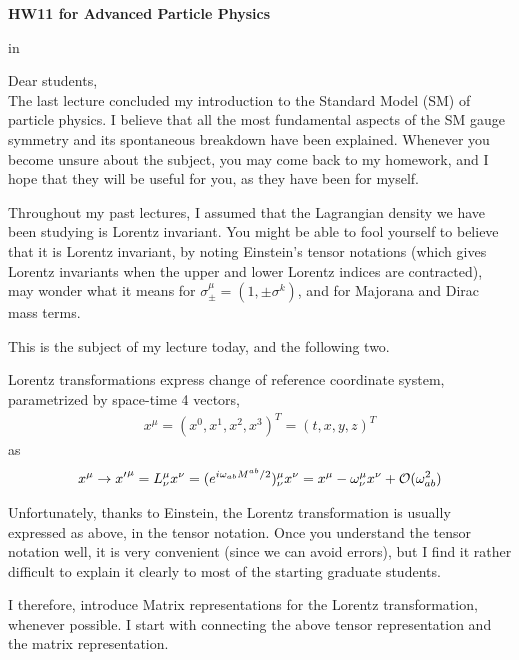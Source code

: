 \documentclass[12pt]{article}
\begin{document}
\begin{center}
{\large\bf HW11 for Advanced Particle Physics} \\

\end{center}

 in

Dear students,\\

  The last lecture concluded my introduction to the Standard Model
  (SM) of particle physics. I believe that all the most fundamental
  aspects of the SM gauge symmetry and its spontaneous breakdown
  have been explained.  Whenever you become unsure about the subject,
  you may come back to my homework, and I hope that they will be
  useful for you, as they have been for myself.

  Throughout my past lectures, I assumed that the Lagrangian
  density we have been studying is Lorentz invariant.  You might
  be able to fool yourself to believe that it is Lorentz invariant,
  by noting Einstein's tensor notations (which gives Lorentz
  invariants when the upper and lower Lorentz indices are
  contracted), may wonder what it means for $\sigma_\pm^\mu
  = (1, \pm \sigma^k)$, and for Majorana and Dirac mass terms.

  This is the subject of my lecture today, and the following two.



  Lorentz transformations express change of reference coordinate
  system, parametrized by space-time 4 vectors,
\begin{eqnarray}
    x^\mu = (x^0, x^1, x^2, x^3)^T = (t, x, y, z)^T \label{eq.11xmu1}
\end{eqnarray}
  as
\begin{eqnarray}
    x^\mu \to {x'}^\mu = L^\mu_\nu x^\nu
                  = (e^{ i \omega_{ab} M^{ab}/2 })^\mu_\nu x^\nu
                  = x^\mu - \omega^\mu_\nu x^\nu + {\cal O}(\omega_{ab}^2) \label{eq.11LT1}
\end{eqnarray}

  Unfortunately, thanks to Einstein, the Lorentz transformation is
  usually expressed as above, in the tensor notation. Once you
  understand the tensor notation well, it is very convenient (since
  we can avoid errors), but I find it rather difficult to explain it
  clearly to most of the starting graduate students.

  I therefore, introduce Matrix representations for the Lorentz
  transformation, whenever possible. I start with connecting the
  above tensor representation and the matrix representation.
\end{document}
